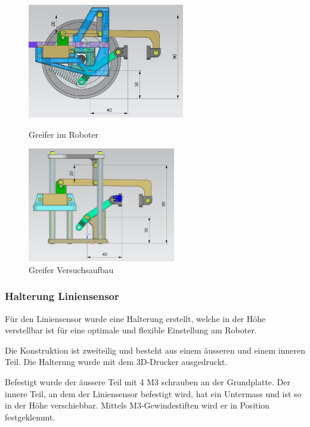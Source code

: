 \begin{figure}[H]
  \centering
  \begin{minipage}[b]{0.45\textwidth}
    \centering
    \includegraphics[height=5cm]{assets/MT/Greifer Montiert.png}
    \caption{Greifer im Roboter}
    \label{fig:Greifer im Roboter}
  \end{minipage}
  \hfill
  \begin{minipage}[b]{0.45\textwidth}
    \centering
    \includegraphics[height=5cm]{assets/MT/Greifer Prototyp.png}
    \caption{Greifer Versuchsaufbau}
    \label{fig:Greifer Versuchsaufbau}
  \end{minipage}
\end{figure}

\newpage

\subsubsection{Halterung Liniensensor}
\label{Halterung Liniensensor}

Für den Liniensensor wurde eine Halterung erstellt, welche in der Höhe verstellbar ist für eine optimale und flexible Einstellung am Roboter.

Die Konstruktion ist zweiteilig und  besteht aus einem äusseren und einem inneren Teil. Die Halterung wurde mit dem 3D-Drucker ausgedruckt.

Befestigt wurde der äussere Teil mit 4 M3 schrauben an der Grundplatte. Der innere Teil, an dem der Liniensensor befestigt wird, hat ein Untermass und ist so in der Höhe verschiebbar. Mittels M3-Gewindestiften wird er in Position festgeklemmt.


